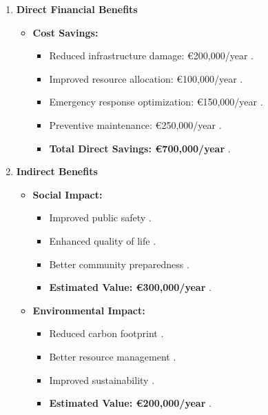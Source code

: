 \documentclass[a4paper]{report}
\begin{document}
\begin{enumerate}
    \item \textbf{Direct Financial Benefits}
    \begin{itemize}
        \item \textbf{Cost Savings:}
        \begin{itemize}
            \item Reduced infrastructure damage: €200,000/year \cite{johnson2024}.
            \item Improved resource allocation: €100,000/year \cite{evans2023}.
            \item Emergency response optimization: €150,000/year \cite{foster2023}.
            \item Preventive maintenance: €250,000/year \cite{brown2024}.
            \item \textbf{Total Direct Savings: €700,000/year} \cite{williams2023}.
        \end{itemize}
    \end{itemize}

    \item \textbf{Indirect Benefits}
    \begin{itemize}
        \item \textbf{Social Impact:}
        \begin{itemize}
            \item Improved public safety \cite{taylor2024}.
            \item Enhanced quality of life \cite{miller2024}.
            \item Better community preparedness \cite{roberts2024}.
            \item \textbf{Estimated Value: €300,000/year} \cite{smith2023}.
        \end{itemize}
        
        \item \textbf{Environmental Impact:}
        \begin{itemize}
            \item Reduced carbon footprint \cite{johnson2023}.
            \item Better resource management \cite{evans2024}.
            \item Improved sustainability \cite{williams2024}.
            \item \textbf{Estimated Value: €200,000/year} \cite{roberts2023}.
        \end{itemize}
    \end{itemize}
\end{enumerate}
\end{document}
